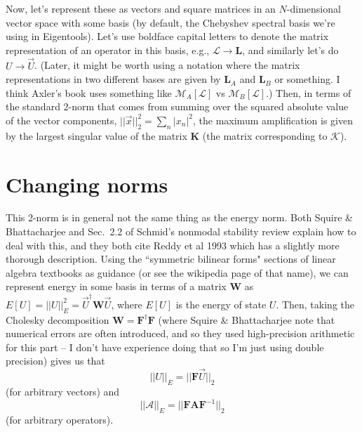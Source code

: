 \documentclass[aps,pop,preprint]{revtex4}
\begin{document}
Now, let's represent these as vectors and square matrices in an $N$-dimensional vector space with some basis (by default, the Chebyshev spectral basis we're using in Eigentools). 
Let's use boldface capital letters to denote the matrix representation of an operator in this basis, e.g., $\mathcal{L} \to \mathbf{L}$, and similarly let's do $U \to \vec{U}$. 
(Later, it might be worth using a notation where the matrix representations in two different bases are given by $\mathbf{L}_A$ and $\mathbf{L}_B$ or something. I think Axler's book uses something like $\mathcal{M}_A[\mathcal{L}]$ vs $\mathcal{M}_B[\mathcal{L}]$.) 
Then, in terms of the standard 2-norm that comes from summing over the squared absolute value of the vector components, $||\vec{x}||_2^2 = \sum_n |x_n|^2$, the maximum amplification is given by the largest singular value of the matrix $\mathbf{K}$ (the matrix corresponding to $\mathcal{K}$).

\section{Changing norms}
\label{sec:norms}
This 2-norm is in general not the same thing as the energy norm. 
Both Squire \& Bhattacharjee and Sec.~2.2 of Schmid's nonmodal stability review explain how to deal with this, and they both cite Reddy et al 1993 which has a slightly more thorough description. 
Using the ``symmetric bilinear forms" sections of linear algebra textbooks as guidance (or see the wikipedia page of that name), we can represent energy in some basis in terms of a matrix $\mathbf{W}$ as $E[U] = ||U||_E^2 = \vec{U}^\dagger\mathbf{W}\vec{U}$, where $E[U]$ is the energy of state $U$.  
Then, taking the Cholesky decomposition $\mathbf{W} = \mathbf{F}^\dagger \mathbf{F}$ (where Squire \& Bhattacharjee note that numerical errors are often introduced, and so they used high-precision arithmetic for this part -- I don't have experience doing that so I'm just using double precision) gives us that 
\begin{equation}
||U||_E = ||\mathbf{F}\vec{U}||_2
\label{eq:E_norm_vector}
\end{equation}
(for arbitrary vectors) and
\begin{equation}
||\mathcal{A}||_E = ||\mathbf{F} \mathbf{A} \mathbf{F}^{-1} ||_2
\label{eq:E_norm_matrix}
\end{equation}
(for arbitrary operators).
\end{document}

